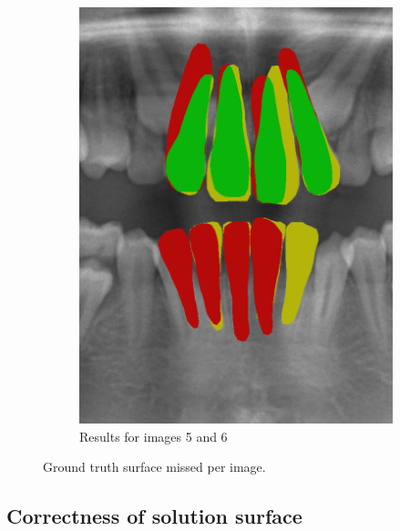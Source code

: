 \documentclass[a4paper,titlepage,12pt]{article}
\begin{document}
\begin{figure}
\begin{subfigure}{0.48\linewidth}
		\includegraphics[width=0.48\columnwidth]{results/6i50}
		\caption{Results for images 5 and 6}
	\end{subfigure}
	\caption{Ground truth surface missed per image.  } %
	\label{fig:miss}
\end{figure}

\subsection{Correctness of solution surface}
\end{document}
